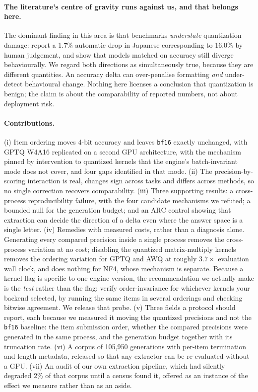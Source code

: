 \documentclass[conference]{IEEEtran}
\begin{document}
\paragraph{The literature's centre of gravity runs against us, and that belongs here.}
The dominant finding in this area is that benchmarks \emph{understate}
quantization damage: \citet{marchisio2024multilingual} report a 1.7\% automatic
drop in Japanese corresponding to 16.0\% by human judgement, and
\citet{dutta2024accuracy} show that models matched on accuracy still diverge
behaviourally. We regard both directions as simultaneously true, because they are
different quantities. An accuracy delta can over-penalise formatting
\emph{and} under-detect behavioural change. Nothing here licenses a conclusion
that quantization is benign; the claim is about the comparability of reported
numbers, not about deployment risk.

\paragraph{Contributions.}
(i) Item ordering moves 4-bit accuracy and leaves \texttt{bf16} exactly unchanged, with
GPTQ W4A16 replicated on a second GPU architecture, with the mechanism pinned by intervention to quantized kernels that the
engine's batch-invariant mode does not cover, and four gaps identified in that mode.
(ii) The precision-by-scoring interaction is real, changes sign across tasks and differs
across methods, so no single correction recovers comparability.
(iii) Three supporting results: a cross-process reproducibility failure, with the four
candidate mechanisms we refuted; a bounded null for the generation budget; and an ARC
control showing that extraction can decide the direction of a delta even where the answer
space is a single letter.
(iv) Remedies with measured costs, rather than a diagnosis alone. Generating every
compared precision inside a single process removes the cross-process variation at no
cost; disabling the quantized matrix-multiply kernels removes the ordering variation for
GPTQ and AWQ at roughly $3.7\times$ evaluation wall clock, and does nothing for NF4,
whose mechanism is separate. Because a kernel flag is specific to one engine version, the
recommendation we actually make is the \emph{test} rather than the flag: verify
order-invariance for whichever kernels your backend selected, by running the same items
in several orderings and checking bitwise agreement. We release that probe.
(v) Three fields a protocol should report, each because we measured it moving the
quantized precisions and not the \texttt{bf16} baseline: the item submission order, whether
the compared precisions were generated in the same process, and the generation budget
together with its truncation rate.
(vi) A corpus of 105{,}950 generations with per-item termination and length
metadata, released so that any extractor can be re-evaluated without a GPU.
(vii) An audit of our own extraction pipeline, which had silently degraded 2\% of
that corpus until a census found it, offered as an instance of the effect we
measure rather than as an aside.
\end{document}
